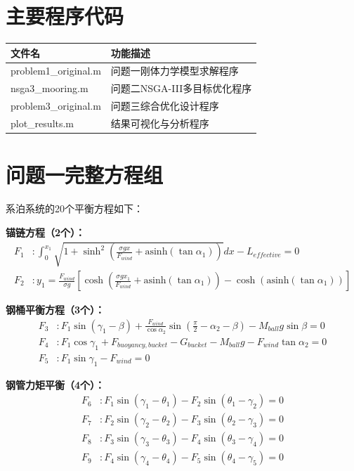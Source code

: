 \documentclass[withoutpreface,bwprint]{cumcmthesis}
\begin{document}
\begin{appendices}
\section{主要程序代码}
\begin{table}[H]
\centering
\begin{tabularx}{\textwidth}{LL}
\toprule
文件名   & 功能描述 \\
\midrule
problem1\_original.m & 问题一刚体力学模型求解程序 \\
nsga3\_mooring.m & 问题二NSGA-III多目标优化程序 \\
problem3\_original.m & 问题三综合优化设计程序 \\
plot\_results.m & 结果可视化与分析程序 \\
\bottomrule
\end{tabularx}
\label{tab:文件列表}
\end{table}

\section{问题一完整方程组}

系泊系统的20个平衡方程如下：

\textbf{锚链方程（2个）：}
\begin{align}
F_1 &: \int_0^{x_1} \sqrt{1 + \sinh^2\left(\frac{\sigma g x}{F_{wind}} + \text{asinh}(\tan\alpha_1)\right)} dx - L_{effective} = 0 \\
F_2 &: y_1 = \frac{F_{wind}}{\sigma g}\left[\cosh\left(\frac{\sigma g x_1}{F_{wind}} + \text{asinh}(\tan\alpha_1)\right) - \cosh(\text{asinh}(\tan\alpha_1))\right]
\end{align}

\textbf{钢桶平衡方程（3个）：}
\begin{align}
F_3 &: F_1 \sin(\gamma_1-\beta) + \frac{F_{wind}}{\cos\alpha_2} \sin\left(\frac{\pi}{2}-\alpha_2-\beta\right) - M_{ball}g\sin\beta = 0 \\
F_4 &: F_1 \cos\gamma_1 + F_{buoyancy,bucket} - G_{bucket} - M_{ball}g - F_{wind}\tan\alpha_2 = 0 \\
F_5 &: F_1 \sin\gamma_1 - F_{wind} = 0
\end{align}

\textbf{钢管力矩平衡（4个）：}
\begin{align}
F_6 &: F_1 \sin(\gamma_1-\theta_1) - F_2 \sin(\theta_1-\gamma_2) = 0 \\
F_7 &: F_2 \sin(\gamma_2-\theta_2) - F_3 \sin(\theta_2-\gamma_3) = 0 \\
F_8 &: F_3 \sin(\gamma_3-\theta_3) - F_4 \sin(\theta_3-\gamma_4) = 0 \\
F_9 &: F_4 \sin(\gamma_4-\theta_4) - F_5 \sin(\theta_4-\gamma_5) = 0
\end{align}


\end{appendices}
\end{document}

